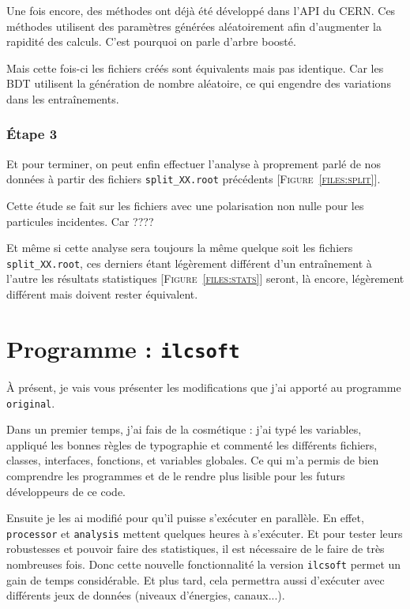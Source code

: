 \documentclass[10pt,a4paper]{report}
\newcommand{\qqs}{quelque soit\xspace}
\newcommand{\original}{\texttt{original}\xspace}
\newcommand{\ilcsoft}{\texttt{ilcsoft}\xspace}
\newcommand{\processor}{\texttt{processor}\xspace}
\newcommand{\analysis}{\texttt{analysis}\xspace}
\newcommand{\doToList}[1]{{\color{red}#1}}
\newcommand{\Figure}[1]{[\textsc{Figure~#1}]}
\begin{document}
Une fois encore, des méthodes ont déjà été développé dans l'API du CERN\cite{root:treeFriend}. Ces méthodes utilisent des paramètres générées aléatoirement afin d'augmenter la rapidité des calculs. C'est pourquoi on parle d'arbre boosté.

Mais cette fois-ci les fichiers créés sont équivalents mais pas identique. Car les BDT utilisent la génération de nombre aléatoire, ce qui engendre des variations dans les entraînements.

\subsubsection{Étape 3}

Et pour terminer, on peut enfin effectuer l'analyse à proprement parlé de nos données à partir des fichiers \texttt{split\_XX.root} précédents \Figure{\ref{files:split}}.

Cette étude se fait sur les fichiers avec une polarisation non nulle pour les particules incidentes. Car \doToList{????}



	






Et même si cette analyse sera toujours la même \qqs les fichiers \texttt{split\_XX.root}, ces derniers étant légèrement différent d'un entraînement à l'autre les résultats statistiques \Figure{\ref{files:stats}} seront, là encore, légèrement différent mais doivent rester équivalent.

\section{Programme : \ilcsoft}

À présent, je vais vous présenter les modifications que j'ai apporté au programme \original.

Dans un premier temps, j'ai fais de la cosmétique : j'ai typé les variables, appliqué les bonnes règles de typographie et commenté les différents fichiers, classes, interfaces, fonctions, et variables globales. Ce qui m'a permis de bien comprendre les programmes et de le rendre plus lisible pour les futurs développeurs de ce code.

Ensuite je les ai modifié pour qu'il puisse s'exécuter en parallèle. En effet, \processor et \analysis mettent quelques heures à s'exécuter. Et pour tester leurs robustesses et pouvoir faire des statistiques, il est nécessaire de le faire de très nombreuses fois. Donc cette nouvelle fonctionnalité la version \ilcsoft permet un gain de temps considérable. Et plus tard, cela permettra aussi d'exécuter avec différents jeux de données (niveaux d'énergies, canaux...).
\end{document}
